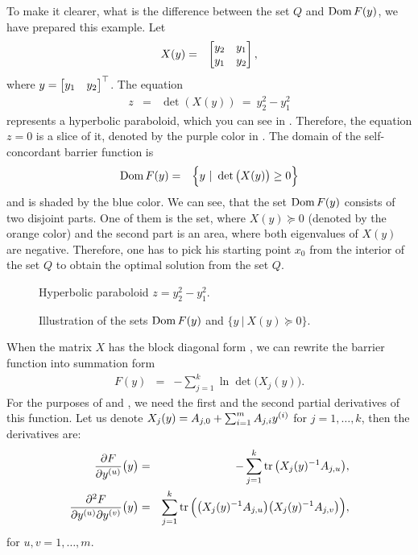 \begin{example}
  To make it clearer, what is the difference between the set $Q$ and $\operatorname{Dom} F(y)$, we have prepared this example. Let
  \begin{eqnarray}
    X(y) &=& \begin{bmatrix} y_2 & y_1 \\ y_1 & y_2 \end{bmatrix},
  \end{eqnarray}
  where $y = \begin{bmatrix} y_1 & y_2 \end{bmatrix}^\top$. The equation
  \begin{eqnarray}
    z &=& \det(X(y))\ =\ y_2^2 - y_1^2
  \end{eqnarray}
  represents a hyperbolic paraboloid, which you can see in .
  Therefore, the equation $z = 0$ is a slice of it, denoted by the purple color in . The domain of the self-concordant barrier function is
  \begin{eqnarray}
    \operatorname{Dom} F(y) &=& \Big\{y\ |\ \det\big(X(y)\big) \geq 0\Big\}
  \end{eqnarray}
  and is shaded by the blue color.
  We can see, that the set $\operatorname{Dom} F(y)$ consists of two disjoint parts. One of them is the set, where $X(y)\succeq0$ (denoted by the orange color) and the second part is an area, where both eigenvalues of $X(y)$ are negative.
  Therefore, one has to pick his starting point $x_0$ from the interior of the set $Q$ to obtain the optimal solution from the set $Q$.

  \begin{figure}[ht]
    \centering
    \resizebox{0.95\textwidth}{!}{}
    \caption{Hyperbolic paraboloid $z = y_2^2 - y_1^2$.}
  \end{figure}

  \begin{figure}[ht]
    \centering
    \resizebox{0.95\textwidth}{!}{}
    \caption{Illustration of the sets $\operatorname{Dom} F(y)$ and $\big\{y\ |\ X(y) \succeq 0\big\}$.}
  \end{figure}
\end{example}

When the matrix $X$ has the block diagonal form , we can rewrite the barrier function  into summation form
\begin{eqnarray}
  F(y) &=& -\sum_{j=1}^k \ln\det\big(X_j(y)\big).
\end{eqnarray}
For the purposes of  and , we need the first and the second partial derivatives of this function.
Let us denote $X_j(y) = A_{j, 0} + \sum_{i=1}^mA_{j, i}y^{(i)}$ for $j = 1, \ldots, k$, then the derivatives are:
\begin{eqnarray}
  \frac{\partial F}{\partial y^{(u)}}\big(y\big) &=& -\sum_{j=1}^k \operatorname{tr}\big(X_j(y)^{-1}A_{j,u}\big),\\
  \frac{\partial^2 F}{\partial y^{(u)} \partial y^{(v)}}\big(y\big) &=& \sum_{j=1}^k \operatorname{tr}\Big(\big(X_j(y)^{-1}A_{j,u}\big)\big(X_j(y)^{-1}A_{j,v}\big)\Big),
\end{eqnarray}
for $u, v = 1,\ldots, m$.

